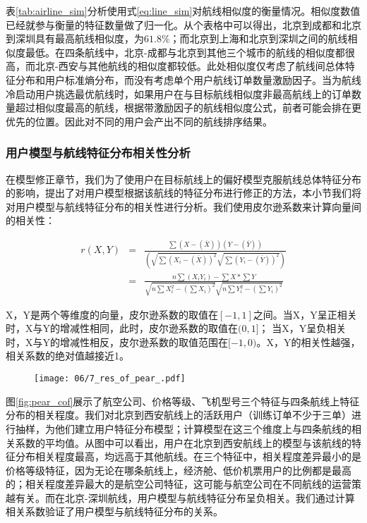 表\ref{tab:airline_sim}分析使用式\ref{eq:line_sim}对航线相似度的衡量情况。相似度数值已经就参与衡量的特征数量做了归一化。从个表格中可以得出，北京到成都和北京到深圳具有最高航线相似度，为$61.8\%$；而北京到上海和北京到深圳之间的航线相似度最低。在四条航线中，北京-成都与北京到其他三个城市的航线的相似度都很高，而北京-西安与其他航线的相似度都较低。此处相似度仅考虑了航线间总体特征分布和用户标准熵分布，而没有考虑单个用户航线订单数量激励因子。当为航线冷启动用户挑选最优航线时，如果用户在与目标航线相似度非最高航线上的订单数量超过相似度最高的航线，根据带激励因子的航线相似度公式，前者可能会排在更优先的位置。因此对不同的用户会产出不同的航线排序结果。

\subsubsection{用户模型与航线特征分布相关性分析}

在模型修正章节，我们为了使用户在目标航线上的偏好模型克服航线总体特征分布的影响，提出了对用户模型根据该航线的特征分布进行修正的方法，本小节我们将对用户模型与航线特征分布的相关性进行分析。我们使用皮尔逊系数来计算向量间的相关性：

\begin{eqnarray}
	r(X,Y)  & = & \frac{\sum(X-(\overline{X}))(Y-(\overline{Y}))}{(\sqrt{\sum(X_i-(\overline{X}))^2}\sqrt{\sum(Y_i-(\overline{Y}))^2})} \nonumber \\
	& = & \frac{n\sum(X_iY_i)-\sum X *\sum Y}{\sqrt{n\sum X_i^2 - (\sum X_i)^2}\sqrt{n\sum Y_i^2 - (\sum Y_i)^2}}
\end{eqnarray}

X，Y是两个等维度的向量，皮尔逊系数的取值在$[-1,1]$之间。当X，Y呈正相关时，X与Y的增减性相同，此时，皮尔逊系数的取值在$(0,1]$；
当X，Y呈负相关时，X与Y的增减性相反，皮尔逊系数的取值范围在$[-1,0)$。X，Y的相关性越强，相关系数的绝对值越接近1。

\begin{figure}[!h]
 \centering
 \texttt{[image: 06/7\_res\_of\_pear\_.pdf]}
\end{figure}

图\ref{fig:pear_cof}展示了航空公司、价格等级、飞机型号三个特征与四条航线上特征分布的相关程度。我们对北京到西安航线上的活跃用户（训练订单不少于三单）进行抽样，为他们建立用户特征分布模型；计算模型在这三个维度上与四条航线的相关系数的平均值。从图中可以看出，用户在北京到西安航线上的模型与该航线的特征分布相关程度最高，均远高于其他航线。在三个特征中，相关程度差异最小的是价格等级特征，因为无论在哪条航线上，经济舱、低价机票用户的比例都是最高的；相关程度差异最大的是航空公司特征，这可能与航空公司在不同航线的运营策越有关。而在北京-深圳航线，用户模型与航线特征分布呈负相关。我们通过计算相关系数验证了用户模型与航线特征分布的关系。

